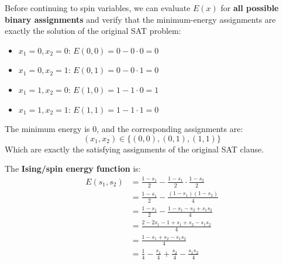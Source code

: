 \highspace
\begin{deepeningbox}
    Before continuing to spin variables, we can evaluate $E(x)$ for \textbf{all possible binary assignments} and verify that the minimum-energy assignments are exactly the solution of the original SAT problem:
    \begin{itemize}
        \item $x_1=0, x_2=0$: $E(0,0) = 0 - 0\cdot 0 = 0$
        \item $x_1=0, x_2=1$: $E(0,1) = 0 - 0\cdot 1 = 0$
        \item $x_1=1, x_2=0$: $E(1,0) = 1 - 1\cdot 0 = 1$
        \item $x_1=1, x_2=1$: $E(1,1) = 1 - 1\cdot 1 = 0$
    \end{itemize}
    The minimum energy is $0$, and the corresponding assignments are:
    \begin{equation*}
        (x_1, x_2) \in \{(0,0), (0,1), (1,1)\}
    \end{equation*}
    Which are exactly the satisfying assignments of the original SAT clause.
\end{deepeningbox}

\highspace
{} The \textbf{Ising/spin energy function} is:
\begin{align*}
    E(s_1, s_2) &= \frac{1 - s_1}{2} - \frac{1 - s_1}{2} \cdot \frac{1 - s_2}{2} \\[.3em]
    &= \frac{1 - s_1}{2} - \frac{(1 - s_1)(1 - s_2)}{4} \\[.3em]
    &= \frac{1 - s_1}{2} - \frac{1 - s_1 - s_2 + s_1 s_2}{4} \\[.3em]
    &= \frac{2 - 2s_1 - 1 + s_1 + s_2 - s_1 s_2}{4} \\[.3em]
    &= \frac{1 - s_1 + s_2 - s_1 s_2}{4} \\[.3em]
    &= \boxed{\frac{1}{4} - \frac{s_1}{4} + \frac{s_2}{4} - \frac{s_1 s_2}{4}}
\end{align*}

